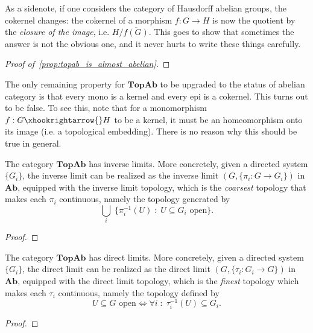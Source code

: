 \begin{remark} As a sidenote, if one considers the category of Hausdorff abelian groups, the cokernel changes: the cokernel of a morphism $f : G \rightarrow H$ is now the quotient by the \emph{closure of the image}, i.e. $H/\overline{f(G)}$. This goes to show that sometimes the answer is not the obvious one, and it never hurts to write these things carefully.
\end{remark}

\begin{proof}[Proof of~\cref{prop:topab_is_almost_abelian}] \TODO
\end{proof}

\begin{remark} The only remaining property for $\textbf{TopAb}$ to be upgraded to the status of abelian category is that every mono is a kernel and every epi is a cokernel. This turns out to be false. To see this, note that for a monomorphism $f : G \xhookrightarrow{} H$ to be a kernel, it must be an homeomorphism onto its image (i.e. a topological embedding). There is no reason why this should be true in general.
\end{remark}

\begin{proposition} The category $\textbf{TopAb}$ has inverse limits. More concretely, given a directed system $\{G_i\}$, the inverse limit can be realized as the inverse limit $(G, \{\pi_i : G \rightarrow G_i\})$ in $\textbf{Ab}$, equipped with the inverse limit topology, which is the \emph{coarsest} topology that makes each $\pi_i$ continuous, namely the topology generated by
$$\bigcup_i \; \{\pi_i^{-1}(U) \;:\; U \subseteq G_i \text{ open}\}.$$
\end{proposition}
\begin{proof} \TODO
\end{proof}

\begin{proposition} The category $\textbf{TopAb}$ has direct limits. More concretely, given a directed system $\{G_i\}$, the direct limit can be realized as the direct limit $(G, \{\tau_i : G_i \rightarrow G\})$ in $\textbf{Ab}$, equipped with the direct limit topology, which is the \emph{finest} topology which makes each $\tau_i$ continuous, namely the topology defined by $$U \subseteq G \text{ open} \iff \forall i \;:\; \tau_i^{-1}(U) \subseteq G_i.$$
\end{proposition}
\begin{proof} \TODO
\end{proof}






